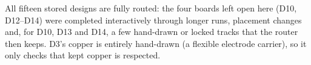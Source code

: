All fifteen stored designs are fully routed: the four boards left open here (D10, D12--D14) were completed interactively through longer runs,  placement changes and, for D10, D13 and D14, a few hand-drawn or locked tracks that the router then keeps. D3's copper is entirely hand-drawn (a flexible electrode carrier), so it only checks that kept copper is respected.
